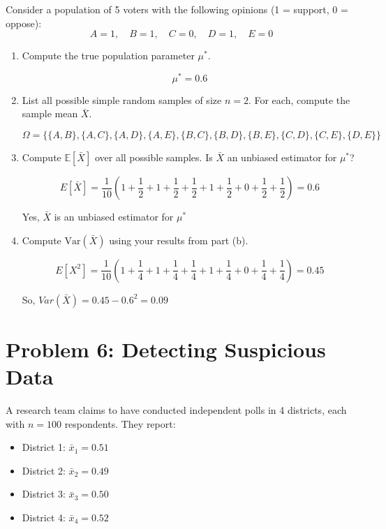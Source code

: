 \documentclass{article}
\begin{document}
Consider a population of 5 voters with the following opinions (1 = support, 0 = oppose):
\[
A = 1, \quad B = 1, \quad C = 0, \quad D = 1, \quad E = 0
\]

\begin{enumerate}[label=(\alph*)]
    \item Compute the true population parameter $\mu^*$.

    \[
        \mu^* = 0.6
    \]

    \item List all possible simple random samples of size $n = 2$. For each, compute the sample mean $\bar{X}$.

    \[
        \Omega = \{\{A, B\}, \{A, C\},  \{A, D\},  \{A, E\},  \{B, C\},  \{B, D\},  \{B, E\},  \{C, D\}, \{C, E\}, \{D, E\}\}
    \]

    \item Compute $\mathbb{E}[\bar{X}]$ over all possible samples. Is $\bar{X}$ an unbiased estimator for $\mu^*$?

    \[
        E[\bar{X}] = \frac{1}{10}(1+\frac{1}{2}+1+\frac{1}{2}+\frac{1}{2}+1+\frac{1}{2}+0+\frac{1}{2}+\frac{1}{2})
         = 0.6
    \]

    Yes, $\bar{X}$ is an unbiased estimator for $\mu^*$
    
    \item Compute $\text{Var}(\bar{X})$ using your results from part (b).

    \[
        E[X^2] = \frac{1}{10}(1+\frac{1}{4}+1+\frac{1}{4}+\frac{1}{4}+1+\frac{1}{4}+0+\frac{1}{4}+\frac{1}{4}) = 0.45
    \]
    
    So, $Var(\bar{X}) = 0.45 - 0.6^2 = 0.09$
\end{enumerate}

\newpage

\section*{Problem 6: Detecting Suspicious Data}

A research team claims to have conducted independent polls in 4 districts, each with $n = 100$ respondents. They report:
\begin{itemize}
    \item District 1: $\bar{x}_1 = 0.51$
    \item District 2: $\bar{x}_2 = 0.49$
    \item District 3: $\bar{x}_3 = 0.50$
    \item District 4: $\bar{x}_4 = 0.52$
\end{itemize}
\end{document}
